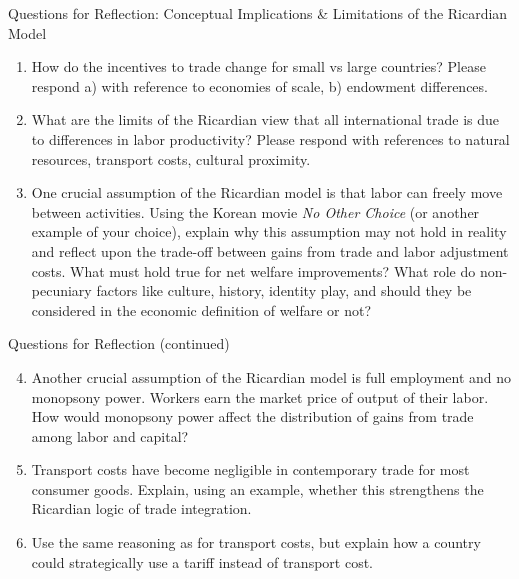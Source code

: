 \documentclass{beamer}
\begin{document}
\begin{frame}{Questions for Reflection: Conceptual Implications \& Limitations of the Ricardian Model}

\small

\begin{enumerate}
    \item How do the incentives to trade change for small vs large countries? Please respond a) with reference to economies of scale, b) endowment differences.
    
    \vspace{0.2cm}
    
    \item What are the limits of the Ricardian view that all international trade is due to differences in labor productivity? Please respond with references to natural resources, transport costs, cultural proximity.
    
    \vspace{0.2cm}
    
    \item One crucial assumption of the Ricardian model is that labor can freely move between activities. Using the Korean movie \textit{No Other Choice} (or another example of your choice), explain why this assumption may not hold in reality and reflect upon the trade-off between gains from trade and labor adjustment costs. What must hold true for net welfare improvements? What role do non-pecuniary factors like culture, history, identity play, and should they be considered in the economic definition of welfare or not?
\end{enumerate}

\end{frame}

\begin{frame}{Questions for Reflection (continued)}

\small

\begin{enumerate}
    \setcounter{enumi}{3}
    
    \item Another crucial assumption of the Ricardian model is full employment and no monopsony power. Workers earn the market price of output of their labor. How would monopsony power affect the distribution of gains from trade among labor and capital?
    
    \vspace{0.3cm}
    
    \item Transport costs have become negligible in contemporary trade for most consumer goods. Explain, using an example, whether this strengthens the Ricardian logic of trade integration.
    
    \vspace{0.3cm}
    
    \item Use the same reasoning as for transport costs, but explain how a country could strategically use a tariff instead of transport cost.
    
\end{enumerate}

\end{frame}
\end{document}
